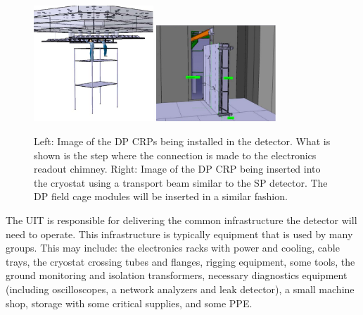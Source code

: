 \begin{figure}[htbp]
\begin{center}
\includegraphics[width=0.4\textwidth]{far-detector-single-phase/figures/CRP-install.pdf}
\includegraphics[width=0.4\textwidth]{far-detector-single-phase/figures/CRP-into-cryostat.pdf}
\caption{Left: Image of the DP CRPs being installed in the detector. What is shown is the step where the connection is made to the electronics readout chimney. Right: Image of the DP CRP being inserted into the cryostat using a transport beam similar to the SP detector. The DP field cage modules will be inserted in a similar fashion.}
\label{fig:CRP-Install}
\end{center}
\end{figure}

The UIT is responsible for delivering the common infrastructure
the detector will need to operate. This infrastructure is typically
equipment that is used by many groups. This may include: the
electronics racks with power and cooling, cable trays, the cryostat
crossing tubes and flanges, rigging equipment, some tools, the ground
monitoring and isolation transformers, necessary diagnostics equipment
(including oscilloscopes, a network analyzers and leak detector), a
small machine shop, storage with some critical supplies, and some PPE.

